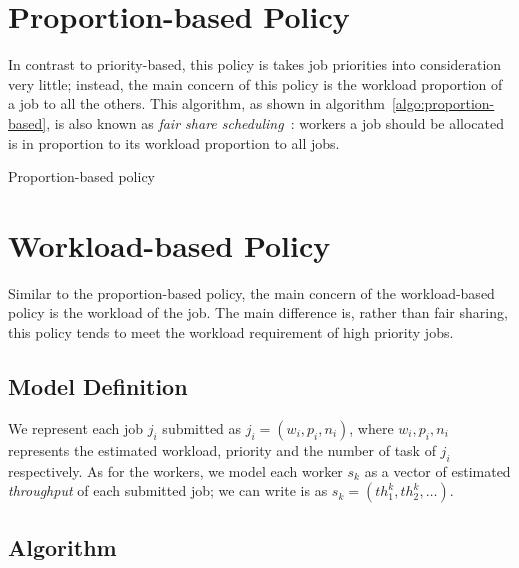 \section{Proportion-based Policy}

In contrast to priority-based, this policy is takes job priorities into
consideration very little; instead, the main concern of this policy is
the workload proportion of a job to all the others.
This algorithm, as shown in algorithm~\ref{algo:proportion-based}, is
also known as \emph{fair share
scheduling}~\cite{cite:fair-share-scheduling}: workers a job should be
allocated is in proportion to its workload proportion to all jobs. 


\begin{algorithm}[H]
  \DontPrintSemicolon %
  
  \caption{Proportion-based policy}
  \label{algo:proportion-based}
\end{algorithm}

\section{Workload-based Policy}

Similar to the proportion-based policy, the main concern of the
workload-based policy is the workload of the job.
The main difference is, rather than fair sharing, this policy tends to
meet the workload requirement of high priority jobs.

\subsection{Model Definition}

We represent each job $j_i$ submitted as $j_i = (w_i, p_i, n_i)$, where
$w_i, p_i, n_i$ represents the estimated workload, priority and the
number of task of $j_i$ respectively.
As for the workers, we model each worker $s_k$ as a vector of estimated
\emph{throughput} of each submitted job; we can write is as $s_k =
(th^k_1, th^k_2, \ldots)$.


\subsection{Algorithm}


